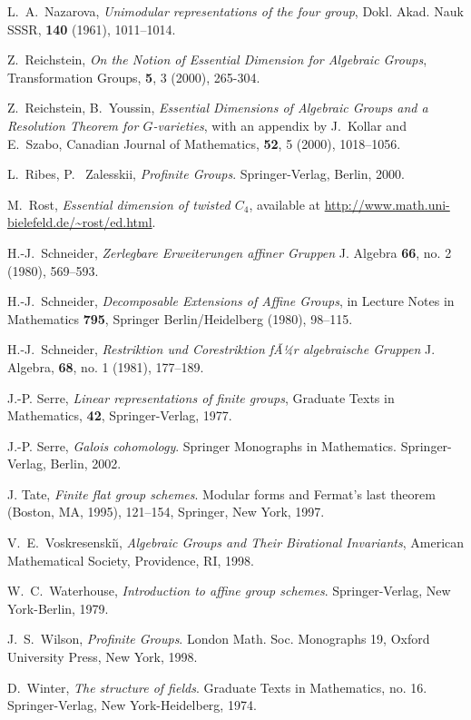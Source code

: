 \documentclass[11pt]{amsart}
\theoremstyle{definition}
\theoremstyle{remark}
\begin{document}
\begin{thebibliography}{99}
L.~A.~Nazarova, {\em Unimodular representations 
of the four group}, Dokl. Akad. Nauk SSSR, {\bf 140} (1961), 1011--1014. 

 Z.~Reichstein, {\em On the Notion of Essential Dimension 
for Algebraic Groups}, Transformation Groups, {\bf 5}, 3 (2000), 265-304.

 Z.~Reichstein, B.~Youssin, {\em Essential Dimensions 
of Algebraic Groups and a Resolution Theorem for $G$-varieties}, 
with an appendix by  J.~Kollar and E.~Szabo, Canadian Journal 
of Mathematics, {\bf 52}, 5 (2000), 1018--1056.

L.~Ribes, P.~ Zalesskii, {\em Profinite Groups}.
Springer-Verlag, Berlin, 2000.

 M.~Rost, {\em Essential dimension of twisted $C_4$},
available at \url{http://www.math.uni-bielefeld.de/~rost/ed.html}.

 H.-J.~Schneider, {\em Zerlegbare 
Erweiterungen affiner Gruppen} J. Algebra {\bf 66}, no. 2 (1980),
569--593.

 H.-J.~Schneider, {\em Decomposable Extensions 
of Affine Groups}, in Lecture Notes in Mathematics {\bf 795}, 
Springer Berlin/Heidelberg (1980), 98--115.

 H.-J.~Schneider, {\em Restriktion und 
Corestriktion fÃ¼r algebraische Gruppen} J. Algebra, {\bf 68},
no. 1 (1981), 177--189.

J.-P. Serre, {\em Linear representations of finite groups},
Graduate Texts in Mathematics, {\bf 42}, Springer-Verlag, 1977.

J.-P. Serre, {\em Galois cohomology}.
Springer Monographs in Mathematics.
Springer-Verlag, Berlin, 2002.

J. Tate, {\em Finite flat group schemes}.
Modular forms and Fermat's last theorem (Boston, MA, 1995),
121--154, Springer, New York, 1997.

V.~E.~Voskresenski{\u\i}, {\em Algebraic
Groups and Their Birational Invariants}, American
Mathematical Society, Providence, RI, 1998.

W.~C.~Waterhouse, {\em Introduction to affine group schemes}.
Springer-Verlag, New York-Berlin, 1979.

J.~S.~Wilson, {\em Profinite Groups}.
London Math. Soc. Monographs 19,
Oxford University Press, New York, 1998.

D.~Winter, {\em The structure of fields}. Graduate Texts in Mathematics, 
no. 16. Springer-Verlag, New York-Heidelberg, 1974.

\end{thebibliography}
\end{document}
